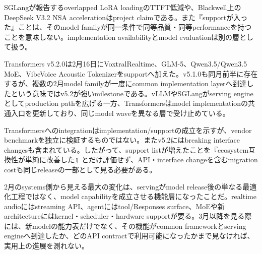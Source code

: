 \begin{claimboundary}
SGLangが報告するoverlapped LoRA loadingのTTFT低減や、Blackwell上のDeepSeek V3.2 NSA accelerationはproject claimである。また『supportが入った』ことは、そのmodel familyが同一条件で同等品質・同等performanceを持つことを意味しない。implementation availabilityとmodel evaluationは別の層として扱う。\autocite{src-5bc0746a47c6}
\end{claimboundary}

Transformers v5.2.0は2月16日にVoxtralRealtime、GLM-5、Qwen3.5/Qwen3.5 MoE、VibeVoice Acoustic Tokenizerをsupportへ加えた。v5.1.0も同月前半に存在するが、複数の2月model familyが一度にcommon implementation layerへ到達したという意味ではv5.2が強いmilestoneである。vLLMやSGLangがserving engineとしてproduction pathを広げる一方、Transformersはmodel implementationの共通入口を更新しており、同じmodel waveを異なる層で受け止めている。\autocite{src-0bd04783f97b,src-a43d64987293}


\begin{claimboundary}
Transformersへのintegrationはimplementation/supportの成立を示すが、vendor benchmarkを独立に検証するものではない。またv5.2にはbreaking interface changesも含まれている。したがって、support listが増えたことを『ecosystem互換性が単純に改善した』とだけ評価せず、API・interface changeを含むmigration costも同じreleaseの一部として見る必要がある。\autocite{src-0bd04783f97b,src-a43d64987293}
\end{claimboundary}

2月のsystems側から見える最大の変化は、servingがmodel release後の単なる最適化工程ではなく、model capabilityを成立させる機能層になったことだ。realtime audioにはstreaming API、agentにはtool/Responses surface、MoEや新architectureにはkernel・scheduler・hardware supportが要る。3月以降を見る際には、新modelの能力表だけでなく、その機能がcommon frameworkとserving engineへ到達したか、どのAPI contractで利用可能になったかまで見なければ、実用上の進展を測れない。\autocite{src-5041feb6f87f,src-5bc0746a47c6,src-a43d64987293}
